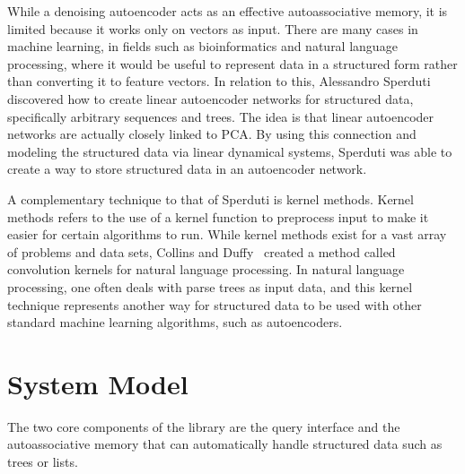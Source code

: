 \documentclass{sig-alternate}
\begin{document}
While a denoising autoencoder acts as an effective autoassociative memory, it is
limited because it works only on vectors as input. There are many cases in machine
learning, in fields such as bioinformatics and natural language processing, where it would be 
useful to represent data in a structured form rather
than converting it to feature vectors. In relation to this, Alessandro Sperduti~\cite{sperduti}
discovered how to create linear autoencoder networks for structured data, specifically
arbitrary sequences and trees. The idea is that linear autoencoder networks are actually
closely linked to PCA. By using this connection and modeling the structured data via
linear dynamical systems, Sperduti was able to create a way to store structured data
in an autoencoder network.

A complementary technique to that of Sperduti is kernel methods. Kernel methods refers to the
use of a kernel function to preprocess input to make it easier for certain algorithms to run. 
While kernel methods exist for a vast array of problems and data sets, Collins and Duffy~\cite{kernels}
created a method called convolution kernels for natural language processing. In natural
language processing, one often deals with parse trees as input data, and this kernel technique
represents another way for structured data to be used with other standard machine learning
algorithms, such as autoencoders.

\section{System Model}\label{sec:sysmodel}



The two core components of the library are the query interface and the autoassociative memory that
can automatically handle structured data such as trees or lists.
\end{document}

